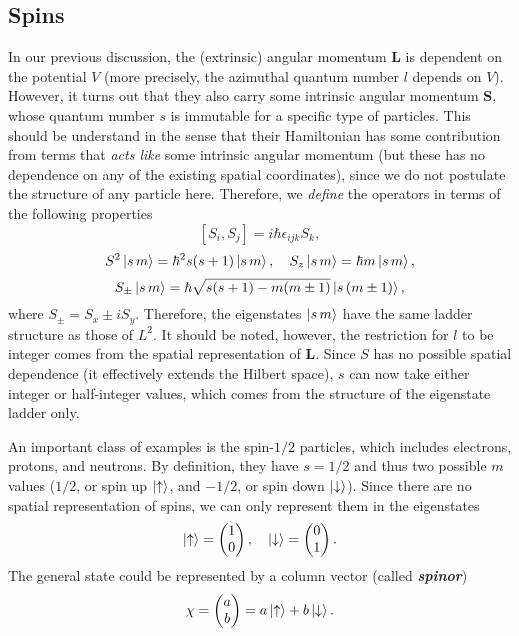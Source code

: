 \documentclass{article}
\newcommand{\up}{\ket{\uparrow}} %
\newcommand{\dn}{\ket{\downarrow}} %
\theoremstyle{nonumberplain}
\begin{document}
\subsection{Spins}
In our previous discussion, the (extrinsic) angular momentum $\mathbf{L}$ is dependent on the potential $V$ (more precisely, the azimuthal quantum number $l$ depends on $V$). However, it turns out that they also carry some intrinsic angular momentum $\mathbf{S},$ whose quantum number $s$ is immutable for a specific type of particles. This should be understand in the sense that their Hamiltonian has some contribution from terms that \textit{acts like} some intrinsic angular momentum (but these has no dependence on any of the existing spatial coordinates), since we do not postulate the structure of any particle here. Therefore, we \textit{define} the operators in terms of the following properties 
\[
    [S_i, S_j] = i \hbar \epsilon_{ijk} S_k,
\]
\[
    S^2 \ket{s \, m} = \hbar ^2 s (s+1) \ket{s \, m}, \quad 
    S_z \ket{s \, m} = \hbar  m \ket{s \, m},
\]
\[
    S_{\pm} \ket{s \, m} = \hbar \sqrt{s(s+1) - m(m \pm 1)} \ket{s \, (m \pm 1)}, 
\]
where $S_{\pm} = S_x \pm i S_y.$ Therefore, the eigenstates $\ket{s \, m}$ have the same ladder structure as those of $L^2.$ It should be noted, however, the restriction for $l$ to be integer comes from the spatial representation of $\mathbf{L}.$ Since $S$ has no possible spatial dependence (it effectively extends the Hilbert space), $s$ can now take either integer or half-integer values, which comes from the structure of the eigenstate ladder only. 

An important class of examples is the spin-$1/2$ particles, which includes electrons, protons, and neutrons. By definition, they have $s = 1 /2 $ and thus two possible $m$ values ($1 / 2$, or spin up $\up$, and $- 1/2$, or spin down $\dn$). Since there are no spatial representation of spins, we can only represent them in the eigenstates 
\[
    \up = \begin{pmatrix}
         1 \\
         0 \\
    \end{pmatrix},
    \quad 
    \dn = \begin{pmatrix}
         0 \\
         1 \\
    \end{pmatrix}.
\]
The general state could be represented by a column vector (called \textit{\textbf{spinor}})
\[
    \chi = \begin{pmatrix}
         a \\
         b \\
    \end{pmatrix} = a \up + b \dn. 
\]
\end{document}

